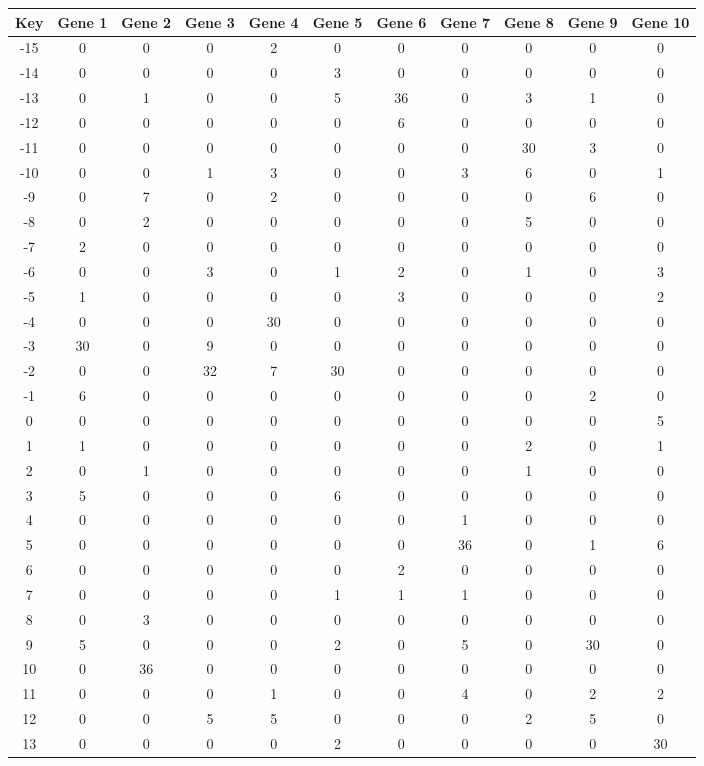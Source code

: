 \begin{tabular}{|c|c|c|c|c|c|c|c|c|c|c|}
\hline
Key & Gene 1 & Gene 2 & Gene 3 & Gene 4 & Gene 5 & Gene 6 & Gene 7 & Gene 8 & Gene 9 & Gene 10 \\
\hline
-15 & 0 & 0 & 0 & 2 & 0 & 0 & 0 & 0 & 0 & 0 \\
-14 & 0 & 0 & 0 & 0 & 3 & 0 & 0 & 0 & 0 & 0 \\
-13 & 0 & 1 & 0 & 0 & 5 & 36 & 0 & 3 & 1 & 0 \\
-12 & 0 & 0 & 0 & 0 & 0 & 6 & 0 & 0 & 0 & 0 \\
-11 & 0 & 0 & 0 & 0 & 0 & 0 & 0 & 30 & 3 & 0 \\
-10 & 0 & 0 & 1 & 3 & 0 & 0 & 3 & 6 & 0 & 1 \\
-9 & 0 & 7 & 0 & 2 & 0 & 0 & 0 & 0 & 6 & 0 \\
-8 & 0 & 2 & 0 & 0 & 0 & 0 & 0 & 5 & 0 & 0 \\
-7 & 2 & 0 & 0 & 0 & 0 & 0 & 0 & 0 & 0 & 0 \\
-6 & 0 & 0 & 3 & 0 & 1 & 2 & 0 & 1 & 0 & 3 \\
-5 & 1 & 0 & 0 & 0 & 0 & 3 & 0 & 0 & 0 & 2 \\
-4 & 0 & 0 & 0 & 30 & 0 & 0 & 0 & 0 & 0 & 0 \\
-3 & 30 & 0 & 9 & 0 & 0 & 0 & 0 & 0 & 0 & 0 \\
-2 & 0 & 0 & 32 & 7 & 30 & 0 & 0 & 0 & 0 & 0 \\
-1 & 6 & 0 & 0 & 0 & 0 & 0 & 0 & 0 & 2 & 0 \\
0 & 0 & 0 & 0 & 0 & 0 & 0 & 0 & 0 & 0 & 5 \\
1 & 1 & 0 & 0 & 0 & 0 & 0 & 0 & 2 & 0 & 1 \\
2 & 0 & 1 & 0 & 0 & 0 & 0 & 0 & 1 & 0 & 0 \\
3 & 5 & 0 & 0 & 0 & 6 & 0 & 0 & 0 & 0 & 0 \\
4 & 0 & 0 & 0 & 0 & 0 & 0 & 1 & 0 & 0 & 0 \\
5 & 0 & 0 & 0 & 0 & 0 & 0 & 36 & 0 & 1 & 6 \\
6 & 0 & 0 & 0 & 0 & 0 & 2 & 0 & 0 & 0 & 0 \\
7 & 0 & 0 & 0 & 0 & 1 & 1 & 1 & 0 & 0 & 0 \\
8 & 0 & 3 & 0 & 0 & 0 & 0 & 0 & 0 & 0 & 0 \\
9 & 5 & 0 & 0 & 0 & 2 & 0 & 5 & 0 & 30 & 0 \\
10 & 0 & 36 & 0 & 0 & 0 & 0 & 0 & 0 & 0 & 0 \\
11 & 0 & 0 & 0 & 1 & 0 & 0 & 4 & 0 & 2 & 2 \\
12 & 0 & 0 & 5 & 5 & 0 & 0 & 0 & 2 & 5 & 0 \\
13 & 0 & 0 & 0 & 0 & 2 & 0 & 0 & 0 & 0 & 30 \\
\hline
\end{tabular}